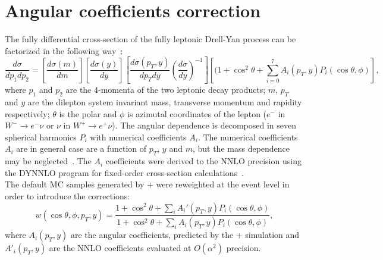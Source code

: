 	\clearpage
     \section{Angular coefficients correction}
     The fully differential cross-section of the fully leptonic Drell-Yan process can be factorized in the following way~\cite{drellyan}:
     \begin{equation}
     	\frac{d\sigma}{dp_1dp_2}=\left[\frac{d\sigma(m)}{dm}\right]\left[\frac{d\sigma(y)}{dy}\right]\left[\frac{d\sigma(p_T,y)}{dp_T dy}\left(\frac{d\sigma}{dy}\right)^{-1}\right]\left[(1+\cos^2{\theta}+\sum_{i=0}^7A_i(p_T,y)P_i(\cos{\theta},\phi)\right],
     \end{equation}
     where $p_1$ and $p_2$ are the 4-momenta of the two leptonic decay products; $m$, $p_T$ and $y$ are the dilepton system invariant mass, transverse momentum and rapidity respectively; $\theta$ is the polar and $\phi$ is azimutal coordinates of the lepton ($e^-$ in $W^-\rightarrow e^-\nu$ or $\nu$ in $W^+\rightarrow e^+\nu$). The angular dependence is decomposed in seven spherical harmonics $P_i$ with numerical coefficients $A_i$. The numerical coefficients $A_i$ are in general case are a function of $p_T$, $y$ and $m$, but the mass dependence may be neglected~\cite{Ais}. The $A_i$ coefficients were derived to the NNLO precision using the DYNNLO program for fixed-order cross-section calculations~\cite{DYNNLO}.\\
     The default MC samples generated by \Powheg+\Pythia{} were reweighted at the event level in order to introduce the corrections:
     \begin{equation}
     	w(\cos{\theta},\phi, p_T, y) = \frac{1+\cos^2{\theta}+\sum_iA_i'(p_T,y)P_i(\cos{\theta},\phi)}{1+\cos^2{\theta}+\sum_iA_i(p_T,y)P_i(\cos{\theta},\phi)},
     \end{equation}
     where $A_i(p_T,y)$ are the angular coefficients, predicted by the \Powheg+\Pythia{} simulation and $A'_i(p_T,y)$ are the NNLO coefficients evaluated at $O(\alpha^2)$ precision.